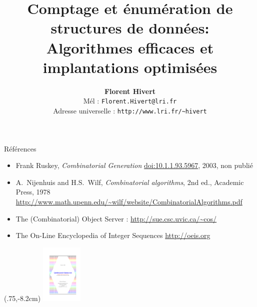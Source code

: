 \documentclass{beamer}
\title[Algorithmes combinatoires]%
{\bf Comptage et énumération de structures de données:
  \\ Algorithmes efficaces et implantations optimisées
}
\author{\textbf{\Large Florent Hivert}\\[5mm]
  Mél : \texttt{Florent.Hivert@lri.fr}\\
  Adresse universelle : \texttt{http://www.lri.fr/\~{ }hivert}
}
\date{}
\def\opstyle#1{\ensuremath{\operatorname{#1}}}
\begin{document}
\newcommand{\Count}{\opstyle{count}}
\newcommand{\List}{\opstyle{list}}
\newcommand{\Iter}{\opstyle{iter}}
\newcommand{\Unrank}{\opstyle{unrank}}
\newcommand{\Rank}{\opstyle{rank}}
\newcommand{\First}{\opstyle{first}}
\newcommand{\Next}{\opstyle{next}}
\newcommand{\Random}{\opstyle{random}}
\newcommand{\Oh}{O}

\frame{\titlepage}



\begin{frame}{Références}
  \begin{itemize}
  \item Frank Ruskey, \textit{Combinatorial Generation}
    \url{doi:10.1.1.93.5967}, 2003, non publié
    \bigskip

  \item A.~Nijenhuis and H.S.~Wilf, \textit{Combinatorial algorithms}, 2nd
    ed., Academic Press, 1978\\
    \url{http://www.math.upenn.edu/~wilf/website/CombinatorialAlgorithms.pdf}
    \bigskip

  \item The (Combinatorial) Object Server : \url{http://sue.csc.uvic.ca/~cos/}
    \bigskip

  \item The On-Line Encyclopedia of Integer Sequences \url{http://oeis.org}
  \end{itemize}
  \begin{textblock*}{100mm}(.75\textwidth,-8.2cm)
    \includegraphics[width=2cm]{media/RuskeyCombGen-1.pdf}
  \end{textblock*}
\end{frame}
\end{document}
